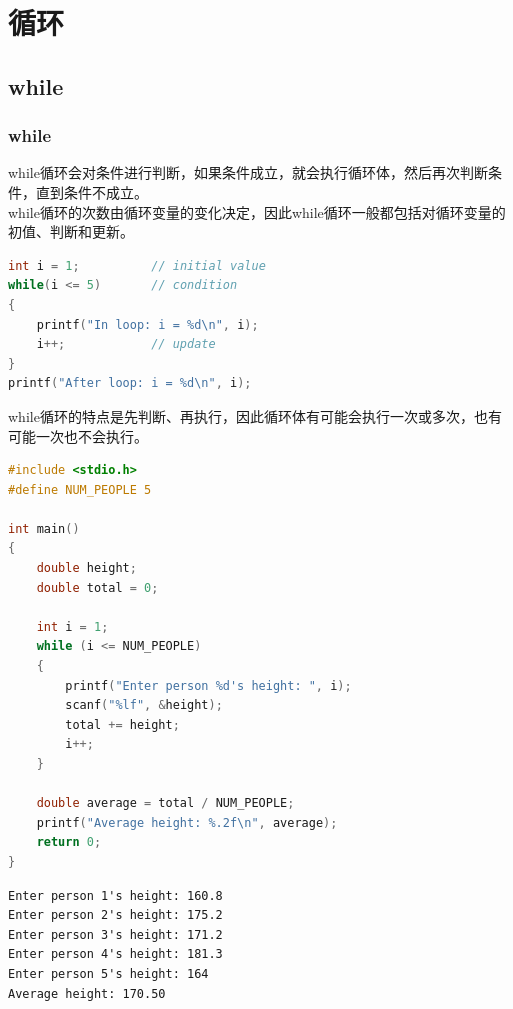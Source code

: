 \chapter{循环}

\section{while}

\subsection{while}

while循环会对条件进行判断，如果条件成立，就会执行循环体，然后再次判断条件，直到条件不成立。\\

while循环的次数由循环变量的变化决定，因此while循环一般都包括对循环变量的初值、判断和更新。

\begin{lstlisting}[language=C]
int i = 1;          // initial value
while(i <= 5)       // condition
{
    printf("In loop: i = %d\n", i);
    i++;            // update
}
printf("After loop: i = %d\n", i);
\end{lstlisting}

while循环的特点是先判断、再执行，因此循环体有可能会执行一次或多次，也有可能一次也不会执行。\\


\begin{lstlisting}[language=C]
#include <stdio.h>
#define NUM_PEOPLE 5

int main()
{
    double height;
    double total = 0;

    int i = 1;
    while (i <= NUM_PEOPLE)
    {
        printf("Enter person %d's height: ", i);
        scanf("%lf", &height);
        total += height;
        i++;
    }

    double average = total / NUM_PEOPLE;
    printf("Average height: %.2f\n", average);
    return 0;
}
\end{lstlisting}

\begin{tcolorbox}
    \begin{verbatim}
Enter person 1's height: 160.8
Enter person 2's height: 175.2
Enter person 3's height: 171.2
Enter person 4's height: 181.3
Enter person 5's height: 164
Average height: 170.50
\end{verbatim}
\end{tcolorbox}

